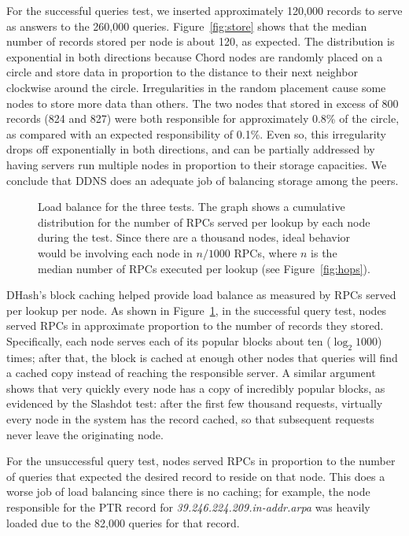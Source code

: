 For the successful queries test, we inserted approximately 120,000
records to serve as answers to the 260,000 queries.
Figure~\ref{fig:store} shows that the median number of
records stored per node is about 120, as expected.
The distribution is exponential in both directions because
Chord nodes are randomly placed on a circle and store data
in proportion to the distance to their next neighbor clockwise
around the circle.  Irregularities in the random placement cause
some nodes to store more data than others.
The two nodes that stored in excess of 800
records (824 and 827) were both responsible for approximately
0.8\% of the circle, as compared with an expected 
responsibility of 0.1\%.
Even so, this irregularity drops off exponentially in both
directions, and can be partially addressed by having servers
run multiple nodes in proportion to their storage capacities.
We conclude that DDNS does an adequate job of balancing
storage among the peers.

\begin{figure}[h]
\caption{Load balance for the three tests.
The graph shows a cumulative distribution for the number
of RPCs served per lookup by each node during the test.
Since there are a thousand nodes, ideal behavior would be
involving each node in $n/1000$ RPCs, where $n$
is the median number of RPCs executed per lookup (see Figure~\ref{fig:hops}).}
\label{fig:both-rpc}
\end{figure}

DHash's block caching helped provide load balance as
measured by RPCs served per lookup per node.
As shown in Figure~\ref{fig:both-rpc},
in the successful query test, nodes served RPCs in
approximate proportion to the number of records they stored.
Specifically, each node serves each of its popular blocks about
ten ($\log_2 1000$) times; after that, the block is cached
at enough other nodes that queries will find a cached copy
instead of reaching the responsible server.
A similar argument shows that very quickly every node has
a copy of incredibly popular blocks, as evidenced by the
Slashdot test: after the first few thousand requests, virtually
every node in the system has the record cached, so that
subsequent requests never leave the originating node.

For the unsuccessful query test, nodes served RPCs in 
proportion to the number of queries that expected the
desired record to reside on that node.
This does a worse job of load balancing since there is
no caching; for example, the node responsible for the
PTR record for {\em 39.246.224.209.in-addr.arpa} was
heavily loaded due to the 82,000 queries for that record.

